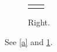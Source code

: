\documentclass{article}
\begin{document}
\begin{figure}
\begin{tabular}{cc}
\begin{minipage}{0.4\textwidth}\caption{Left.}\label{a}\end{minipage} &
\begin{minipage}{0.4\textwidth}\caption{Right.}\label{b}\end{minipage}
\end{tabular}
\end{figure}
See \ref{a} and \ref{b}.
\end{document}
